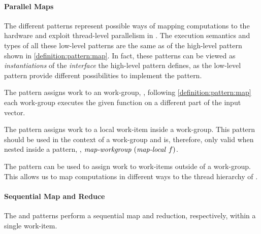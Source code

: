 \paragraph{Parallel Maps}
The different \OpenCL \map patterns represent possible ways of mapping computations to the hardware and exploit thread-level parallelism in \OpenCL.
The execution semantics and types of all these low-level \OpenCL \map patterns are the same as of the high-level \map pattern shown in \autoref{definition:pattern:map}.
In fact, these patterns can be viewed as \emph{instantiations} of the \emph{interface} the high-level \map pattern defines, as the low-level \OpenCL pattern provide different possibilities to implement the \map pattern.

The \mapWorkgroup pattern assigns work to an \OpenCL work-group, \ie, following \autoref{definition:pattern:map} each \OpenCL work-group executes the given function on a different part of the input vector.

The \mapLocal pattern assigns work to a local work-item inside a work-group.
This pattern should be used in the context of a work-group and is, therefore, only valid when nested inside a \mapWorkgroup pattern, \eg, $\text{\textit{map-workgroup}}\ (\text{\textit{map-local}}\ f)$.

The \mapGlobal pattern can be used to assign work to work-items outside of a work-group.
This allows us to map computations in different ways to the thread hierarchy of \OpenCL.


\FloatBarrier

\paragraph{Sequential Map and Reduce}
The \mapSeq and \reduceSeq patterns perform a sequential map and reduction, respectively, within a single work-item.

